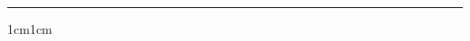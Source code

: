 \documentclass{article}
\begin{document}

{\CLCompanyHeader}

\vspace{-1em} %

\rule{\linewidth}{1pt} %

\bigskip %



\hfill %
\CLContactMe

\bigskip %

\CLContactCompany


\bigskip\bigskip %

\begin{adjustwidth}{1cm}{1cm}

{\CLPosition}

\bigskip


\CLContent

\end{adjustwidth}
\end{document}
